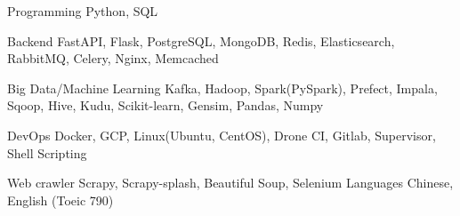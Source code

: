

\begin{cvskills}

  \cvskill
    {Programming} %
    {Python, SQL} %

  \cvskill
    {Backend} %
    {FastAPI, Flask, PostgreSQL, MongoDB, Redis, Elasticsearch, RabbitMQ, Celery, Nginx, Memcached} %

  \cvskill
    {Big Data/Machine Learning} %
    {Kafka, Hadoop, Spark(PySpark), Prefect, Impala, Sqoop, Hive, Kudu, Scikit-learn, Gensim, Pandas, Numpy} %

  \cvskill
    {DevOps} %
    {Docker, GCP, Linux(Ubuntu, CentOS), Drone CI, Gitlab, Supervisor, Shell Scripting}

  \cvskill
    {Web crawler}
    {Scrapy, Scrapy-splash, Beautiful Soup, Selenium}
  \cvskill
    {Languages} %
    {Chinese, English (Toeic 790)} %

\end{cvskills}
